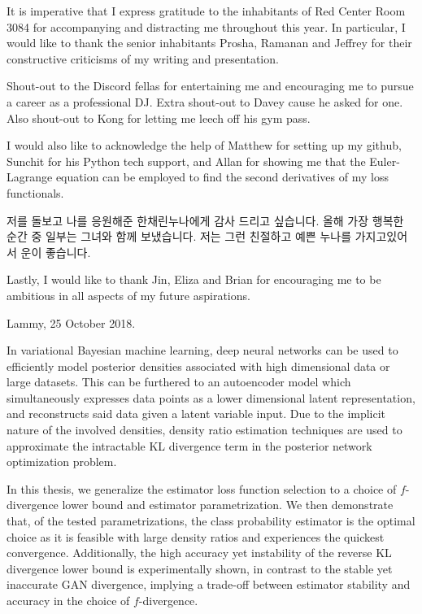 \documentclass[honours,12pt, twoside]{unswthesis}
\numberwithin{equation}{section}
\theoremstyle{definition}
\begin{document}
{\bigskip\noindent}It is imperative that I express gratitude to the inhabitants of Red Center Room 3084 for accompanying and distracting me throughout this year. In particular, I would like to thank the senior inhabitants Prosha, Ramanan and Jeffrey for their constructive criticisms of my writing and presentation.

{\bigskip\noindent}Shout-out to the Discord fellas for entertaining me and encouraging me to pursue a career as a professional DJ. Extra shout-out to Davey cause he asked for one. Also shout-out to Kong for letting me leech off his gym pass.

{\bigskip\noindent}I would also like to acknowledge the help of Matthew for setting up my github, Sunchit for his Python tech support, and Allan for showing me that the Euler-Lagrange equation can be employed to find the second derivatives of my loss functionals.

{\bigskip\noindent}저를 돌보고 나를 응원해준 한채린누나에게 감사 드리고 싶습니다. 올해 가장 행복한 순간 중 일부는 그녀와 함께 보냈습니다. 저는 그런 친절하고 예쁜 누나를 가지고있어서 운이 좋습니다.

{\bigskip\noindent}Lastly, I would like to thank Jin, Eliza and Brian for encouraging me to be ambitious in all aspects of my future aspirations.

{\bigskip\bigskip\bigskip\noindent}Lammy, 25 October 2018.

\afterpage{\cleardoublepage}


In variational Bayesian machine learning, deep neural networks can be used to efficiently model posterior densities associated with high dimensional data or large datasets. This can be furthered to an autoencoder model which simultaneously expresses data points as a lower dimensional latent representation, and reconstructs said data given a latent variable input. Due to the implicit nature of the involved densities, density ratio estimation techniques are used to approximate the intractable KL divergence term in the posterior network optimization problem. 

In this thesis, we generalize the estimator loss function selection to a choice of $f$-divergence lower bound and estimator parametrization. We then demonstrate that, of the tested parametrizations, the class probability estimator is the optimal choice as it is feasible with large density ratios and experiences the quickest convergence. Additionally, the high accuracy yet instability of the reverse KL divergence lower bound is experimentally shown, in contrast to the stable yet inaccurate GAN divergence, implying a trade-off between estimator stability and accuracy in the choice of $f$-divergence.
\afterpage{\clearpage}
\end{document}
